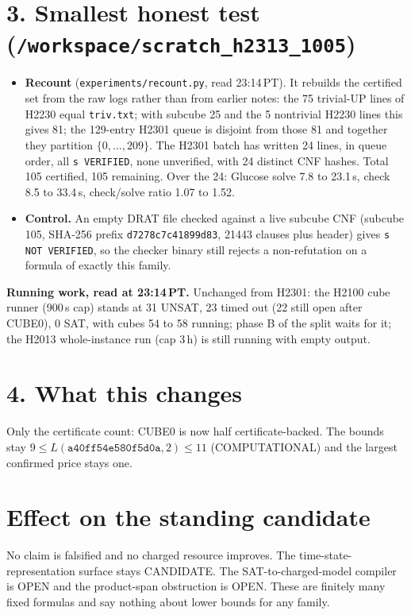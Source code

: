 \documentclass[11pt]{article}
\begin{document}
\section*{3. Smallest honest test (\texttt{/workspace/scratch\_h2313\_1005})}
\begin{itemize}
\item \textbf{Recount} (\texttt{experiments/recount.py}, read 23:14\,PT). It rebuilds the certified set from the raw logs rather than from earlier notes: the 75 trivial-UP lines of H2230 equal \texttt{triv.txt}; with subcube 25 and the 5 nontrivial H2230 lines this gives 81; the 129-entry H2301 queue is disjoint from those 81 and together they partition $\{0,\dots,209\}$. The H2301 batch has written 24 lines, in queue order, all \texttt{s VERIFIED}, none unverified, with 24 distinct CNF hashes. Total 105 certified, 105 remaining. Over the 24: Glucose solve 7.8 to 23.1\,s, check 8.5 to 33.4\,s, check/solve ratio 1.07 to 1.52.
\item \textbf{Control.} An empty DRAT file checked against a live subcube CNF (subcube 105, SHA-256 prefix \texttt{d7278c7c41899d83}, 21443 clauses plus header) gives \texttt{s NOT VERIFIED}, so the checker binary still rejects a non-refutation on a formula of exactly this family.
\end{itemize}

\textbf{Running work, read at 23:14\,PT.} Unchanged from H2301: the H2100 cube runner (900\,s cap) stands at 31 UNSAT, 23 timed out (22 still open after CUBE0), 0 SAT, with cubes 54 to 58 running; phase B of the split waits for it; the H2013 whole-instance run (cap 3\,h) is still running with empty output.

\section*{4. What this changes}
Only the certificate count: CUBE0 is now half certificate-backed. The bounds stay $9\le L(\texttt{a40ff54e580f5d0a},2)\le 11$ (COMPUTATIONAL) and the largest confirmed price stays one.

\section*{Effect on the standing candidate}
No claim is falsified and no charged resource improves. The time-state-representation surface stays CANDIDATE. The SAT-to-charged-model compiler is OPEN and the product-span obstruction is OPEN. These are finitely many fixed formulas and say nothing about lower bounds for any family.
\end{document}

